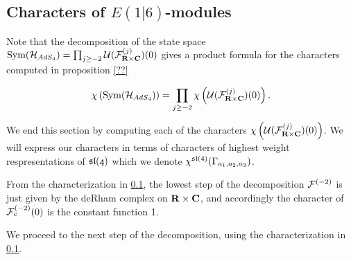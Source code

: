 \documentclass[../main.tex]{subfiles}
\begin{document}
\subsection{Characters of $E(1|6)$-modules}

Note that the decomposition of the state space $\text{Sym} (\mathcal{H}_{AdS_4} ) = \prod_{j\geq -2} \mathcal{U} (\mathcal{F}^{(j)} _{\mathbf{R}\times \mathbf{C}} )(0)$ gives a product formula for the characters computed in proposition \ref{??}




\[\chi \left (\text{Sym} (\mathcal{H}_{AdS_4} ) \right )= \prod_{j\geq -2} \chi \left ( \mathcal{U} (\mathcal{F}^{(j)} _{\mathbf{R}\times \mathbf{C}} )(0)\right ).\]

We end this section by computing each of the characters $\chi \left ( \mathcal{U} (\mathcal{F}^{(j)} _{\mathbf{R}\times \mathbf{C}} )(0)\right )$. We will express our characters in terms of characters of highest weight respresentations of $\mathfrak{sl(4)}$ which we denote $\chi^{\mathfrak{sl}(4)}(\Gamma_{a_1,a_2, a_3} )$.

\parsec[]
From the characterization in \ref{}, the lowest step of the decomposition $\mathcal{F}^{(-2)}$ is just given by the deRham complex on $\mathbf{R}\times \mathbf{C}$, and accordingly the character of $\mathcal{F}^{(-2)}_{c}(0)$ is the constant function 1.

\parsec[]
We proceed to the next step of the decomposition, using the characterization in \ref{}.
\end{document}
